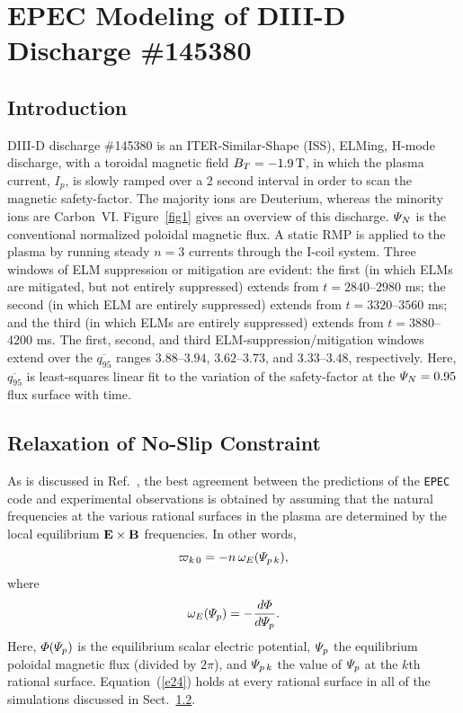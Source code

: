\documentclass[12pt,prb,aps]{revtex4-1}
\begin{document}
\section{EPEC Modeling of DIII-D Discharge \#145380}\label{s4}
\subsection{Introduction}
DIII-D discharge \#145380 is an ITER-Similar-Shape (ISS), ELMing, H-mode discharge, with a toroidal magnetic field $B_T=-1.9\,{\rm T}$, in which the
plasma current, $I_p$, is slowly ramped over a 2 second interval in order to scan the magnetic safety-factor.\cite{d3d,d3d2} The majority ions are Deuterium, whereas the
minority ions are Carbon~VI.
Figure~\ref{fig1} gives an overview of this discharge. ${\mit\Psi}_N$ is the conventional normalized poloidal magnetic flux.
A static RMP is applied to the plasma by running steady $n=3$ currents through the I-coil system.\cite{icoil}
Three windows of ELM suppression or mitigation are evident: the first (in which ELMs are mitigated, but not
entirely suppressed) extends from $t=2840$--$2980$ ms; the
second (in which ELM are entirely suppressed) extends from $t=3320$--$3560$ ms; and the third (in which ELMs are
entirely suppressed) extends from $t=3880$--$4200$ ms. The 
first, second, and third ELM-suppression/mitigation windows extend over the $\overline{q_{95}}$ ranges $3.88$--$3.94$, $3.62$--$3.73$,
and $3.33$--$3.48$, respectively. Here, $\overline{q_{95}}$ is least-squares linear fit to the variation of the safety-factor at the ${\mit\Psi}_N = 0.95$ flux surface with time. 

\subsection{Relaxation of No-Slip Constraint}\label{s4a}
As is discussed in Ref.~, the best agreement between the predictions of the {\tt EPEC} code and experimental observations is
obtained by assuming that the natural frequencies at the various rational surfaces in the plasma are determined by the
local equilibrium ${\bf E}\times {\bf B}$ frequencies. In other words, 
\begin{equation}\label{e24}
\varpi_{k\,0} =-n\,\omega_E({\mit\Psi}_{p\,k}),
\end{equation}
where 
\begin{equation}
\omega_E({\mit\Psi}_p) = -\frac{d{\mit\Phi}}{d{\mit\Psi}_p}.
\end{equation}
Here, ${\mit\Phi}({\mit\Psi}_p)$ is the equilibrium scalar electric potential, ${\mit\Psi}_p$ the equilibrium poloidal magnetic flux (divided by $2\pi$), 
and ${\mit\Psi}_{p\,k}$  the value of ${\mit\Psi}_p$ at the $k$th rational surface.  Equation~(\ref{e24}) holds at
every rational surface in all of the simulations discussed in Sect.~\ref{s4a}. 
\end{document}
